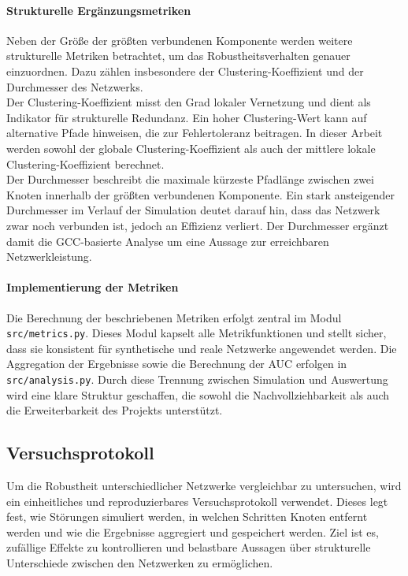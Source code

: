 \paragraph{Strukturelle Ergänzungsmetriken}
Neben der Größe der größten verbundenen Komponente werden weitere
strukturelle Metriken betrachtet, um das Robustheitsverhalten genauer
einzuordnen. Dazu zählen insbesondere der Clustering-Koeffizient und der
Durchmesser des Netzwerks.\\
Der Clustering-Koeffizient misst den Grad lokaler Vernetzung und dient als
Indikator für strukturelle Redundanz. Ein hoher Clustering-Wert kann auf
alternative Pfade hinweisen, die zur Fehlertoleranz beitragen. In dieser Arbeit
werden sowohl der globale Clustering-Koeffizient als auch der mittlere lokale
Clustering-Koeffizient berechnet.\\
Der Durchmesser beschreibt die maximale kürzeste Pfadlänge zwischen zwei
Knoten innerhalb der größten verbundenen Komponente. Ein stark ansteigender
Durchmesser im Verlauf der Simulation deutet darauf hin, dass das Netzwerk zwar
noch verbunden ist, jedoch an Effizienz verliert. Der Durchmesser ergänzt damit
die GCC-basierte Analyse um eine Aussage zur erreichbaren Netzwerkleistung.

\paragraph{Implementierung der Metriken}
Die Berechnung der beschriebenen Metriken erfolgt zentral im Modul
\texttt{src/metrics.py}. Dieses Modul kapselt alle Metrikfunktionen und stellt
sicher, dass sie konsistent für synthetische und reale Netzwerke angewendet
werden. Die Aggregation der Ergebnisse sowie die Berechnung der AUC erfolgen in
\texttt{src/analysis.py}. Durch diese Trennung zwischen Simulation und
Auswertung wird eine klare Struktur geschaffen, die sowohl die
Nachvollziehbarkeit als auch die Erweiterbarkeit des Projekts unterstützt.

\subsection{Versuchsprotokoll}

Um die Robustheit unterschiedlicher Netzwerke vergleichbar zu untersuchen,
wird ein einheitliches und reproduzierbares Versuchsprotokoll verwendet.
Dieses legt fest, wie Störungen simuliert werden, in welchen Schritten Knoten
entfernt werden und wie die Ergebnisse aggregiert und gespeichert werden. Ziel
ist es, zufällige Effekte zu kontrollieren und belastbare Aussagen über
strukturelle Unterschiede zwischen den Netzwerken zu ermöglichen.

